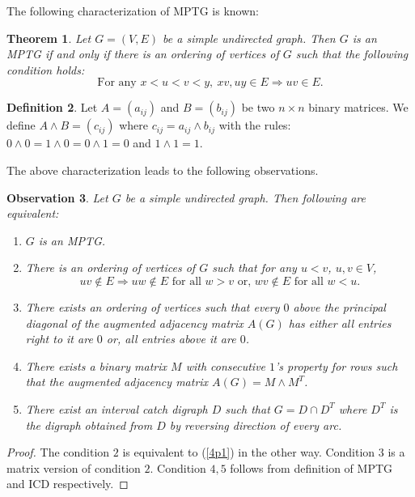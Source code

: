 \documentclass{article}
\newtheorem{thm}{Theorem}[section]
\newtheorem{obs}[thm]{Observation}
\theoremstyle{definition}
\newtheorem{defn}[thm]{Definition}
\numberwithin{equation}{section}
\begin{document}
\noindent The following characterization of MPTG is known:

\begin{thm} \label{mptg1} \cite{Catanzaro}
Let $G=(V,E)$ be a simple undirected graph. Then $G$ is an MPTG if and only if there is an ordering of vertices of $G$ such that the following condition holds:
\begin{equation}\label{4p1}
\text{For any } x<u<v<y,\ xv,uy\in E \Longrightarrow uv\in E.
\end{equation}
\end{thm}

\begin{defn}
Let $A=(a_{ij})$ and $B=(b_{ij})$ be two $n\times n$ binary matrices. We define $A \wedge B=(c_{ij})$ where $c_{ij}=a_{ij}\wedge b_{ij}$ with the rules: $0\wedge 0=1\wedge 0=0\wedge 1=0$ and $1\wedge 1=1$.
\end{defn}

\noindent The above characterization leads to the following observations.

\begin{obs}\label{obsmptg}
Let $G$ be a simple undirected graph. Then following are equivalent:
\begin{enumerate}
\item $G$ is an MPTG.
\item There is an ordering of vertices of $G$ such that for any $u<v$, $u,v\in V$,
\begin{equation}
uv\not\in E \Longrightarrow uw\not\in E\text{ for all }w>v\text{ or, }wv\not\in E\text{ for all }w<u.
\end{equation}
\item There exists an ordering of vertices such that every $0$ above the principal diagonal of the augmented adjacency matrix $A(G)$ has either all entries right to it are $0$ or, all entries above it are $0$.
\item There exists a binary matrix $M$ with consecutive $1$'s property for rows such that the augmented adjacency matrix $A(G)=M\wedge M^T$.

\item  There exist an interval catch digraph $D$ such that $G=D\cap D^{T}$ where $D^{T}$ is the digraph obtained from $D$ by reversing direction of every arc.
\end{enumerate}
\end{obs}

\begin{proof}
The condition $2$ is equivalent to (\ref{4p1}) in the other way. Condition $3$ is a matrix version of condition $2$. Condition $4,5$ follows from definition of MPTG and ICD respectively.
\end{proof}
\end{document}
